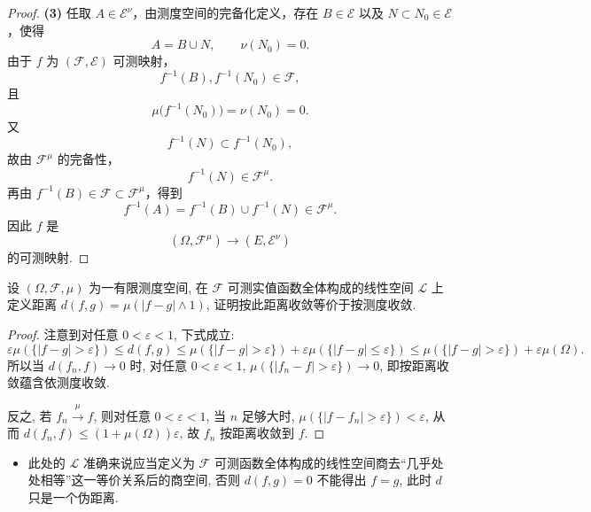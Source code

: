 \begin{proof}
            \textbf{(3)}
            任取 $A\in\mathcal{E}^{\nu}$，由测度空间的完备化定义，存在
            $B\in\mathcal{E}$ 以及 $N\subset N_0\in\mathcal{E}$，使得
            \[
                A=B\cup N,
                \qquad
                \nu(N_0)=0.
            \]
            由于 $f$ 为 $(\mathcal{F},\mathcal{E})$ 可测映射，
            \[
                f^{-1}(B),f^{-1}(N_0)\in\mathcal{F},
            \]
            且
            \[
                \mu\bigl(f^{-1}(N_0)\bigr)
                =\nu(N_0)
                =0.
            \]
            又
            \[
                f^{-1}(N)\subset f^{-1}(N_0),
            \]
            故由 $\mathcal{F}^{\mu}$ 的完备性，
            \[
                f^{-1}(N)\in\mathcal{F}^{\mu}.
            \]
            再由 $f^{-1}(B)\in\mathcal{F}\subset\mathcal{F}^{\mu}$，得到
            \[
                f^{-1}(A)=f^{-1}(B)\cup f^{-1}(N)\in\mathcal{F}^{\mu}.
            \]
            因此 $f$ 是
            \[
                (\Omega,\mathcal{F}^{\mu})
                \longrightarrow
                (E,\mathcal{E}^{\nu})
            \]
            的可测映射.
        \end{proof}
        \begin{7}
            设 $(\Omega,\mathcal{F},\mu)$ 为一有限测度空间, 
            在 $\mathcal{F}$ 可测实值函数全体构成的线性空间 $\mathcal{L}$ 上定义距离 $d(f,g)=\mu(|f-g|\wedge 1)$, 
            证明按此距离收敛等价于按测度收敛.
        \end{7}
        \begin{proof}
            注意到对任意 $0<\varepsilon<1$, 下式成立: 
            \[
                \varepsilon\mu(\{|f-g|>\varepsilon\})\leqslant d(f,g)\leqslant\mu(\{|f-g|>\varepsilon\})+\varepsilon\mu(\{|f-g|\leqslant\varepsilon\})\leqslant\mu(\{|f-g|>\varepsilon\})+\varepsilon\mu(\Omega).
            \]
            所以当 $d(f_n,f)\to 0$ 时, 对任意 $0<\varepsilon<1$, $\mu(\{|f_n-f|>\varepsilon\})\to 0$, 
            即按距离收敛蕴含依测度收敛.

            反之, 若 $f_n\stackrel{\mu}{\longrightarrow}f$, 则对任意 $0<\varepsilon<1$, 
            当 $n$ 足够大时, 
            $\mu(\{|f-f_n|>\varepsilon\})<\varepsilon$, 
            从而 $d(f_n,f)\leqslant (1+\mu(\Omega))\varepsilon$, 
            故 $f_n$ 按距离收敛到 $f$.
        \end{proof}
        \begin{itemize}
            \item[\textbf{注.}] 此处的 $\mathcal{L}$ 准确来说应当定义为 $\mathcal{F}$ 可测函数全体构成的线性空间商去``几乎处处相等''这一等价关系后的商空间, 
            否则 $d(f,g)=0$ 不能得出 $f=g$, 此时 $d$ 只是一个伪距离. 
        \end{itemize}
